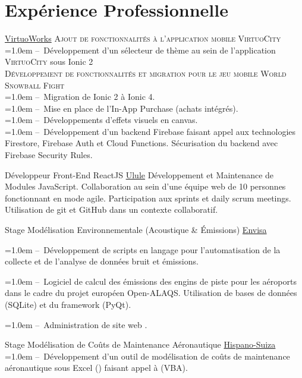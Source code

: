 \documentclass[10pt, a4paper]{article}
\begin{document}
\section{Expérience Professionnelle}
\begin{experiences}
	{\hfill}
	{\href{https://www.virtuoworks.com}
		{VirtuoWorks}}
	{
		\textsc{Ajout de fonctionnalités à l’application mobile VirtuoCity}\\
		\hangindent=1.0em --~Développement d’un sélecteur de thème au sein de l’application \textsc{VirtuoCity} sous Ionic 2\\
		\textsc{Développement de fonctionnalités et migration pour le jeu mobile World Snowball Fight}\\
		\hangindent=1.0em --~Migration de Ionic 2 à Ionic 4.\\
		\hangindent=1.0em --~Mise en place de l’In-App Purchase (achats intégrés).\\
		\hangindent=1.0em --~Développements d’effets visuels en canvas.\\
		\hangindent=1.0em --~Développement d’un backend Firebase faisant appel aux technologies Firestore, Firebase Auth et Cloud Functions. Sécurisation du backend avec Firebase Security Rules.
	}
	
	{Développeur Front-End ReactJS}
	{\hfill}
	{\href{https://www.ulule.com}{Ulule}}
	{Développement et Maintenance de Modules JavaScript. Collaboration au sein d’une équipe web de 10 personnes fonctionnant en mode agile. Participation aux sprints et daily scrum meetings. Utilisation de git et GitHub dans un contexte collaboratif.\\}
	
	{Stage Modélisation Environnementale (Acoustique \& \'Emissions)}
	{\hfill}
	{\href{http://www.env-isa.com}{Envisa}}
	{\hangindent=1.0em --~Développement de scripts en langage \python pour l'automatisation de la collecte et de l'analyse de données bruit et émissions.
		
		\hangindent=1.0em --~Logiciel \python de calcul des émissions des engins de piste pour les aéroports dans le cadre du projet européen Open-ALAQS. Utilisation de bases de données \sql (SQLite) et du framework \qt (PyQt).
		
		\hangindent=1.0em --~Administration de site web \wordpress.}
	{Stage Modélisation de Coûts de Maintenance Aéronautique}
	{\hfill}
	{\href{http://www.safran-transmission-systems.com}{Hispano-Suiza}}
	{\hangindent=1.0em --~Développement d'un outil de modélisation de coûts de maintenance aéronautique sous Excel (\office) faisant appel à \visb (VBA).}
\end{experiences}
\vspace{-0.5cm}
\end{document}
